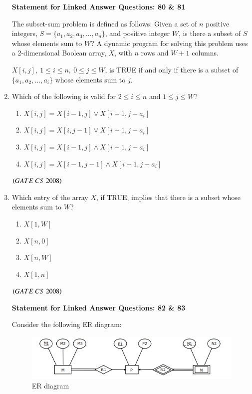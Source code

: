 \documentclass[journal, onecolumn]{IEEEtran}
\numberwithin{equation}{enumi}
\numberwithin{figure}{enumi}
\begin{document}
\begin{enumerate}
\begin{center}
\textbf{Statement for Linked Answer Questions: 80 \& 81}
\end{center}
\bigskip
The subset-sum problem is defined as follows: Given a set of $n$ positive integers, $S = \{a_1, a_2, a_3, \dots, a_n\}$, and positive integer $W$, is there a subset of $S$ whose elements sum to $W$? A dynamic program for solving this problem uses a 2-dimensional Boolean array, $X$, with $n$ rows and $W+1$ columns.

$X[i, j], \ 1 \leq i \leq n, \ 0 \leq j \leq W$, is TRUE if and only if there is a subset of $\{a_1, a_2, \dots, a_i\}$ whose elements sum to $j$.
\bigskip

\item Which of the following is valid for $2 \leq i \leq n$ and $1 \leq j \leq W$? 
\vspace{-1em}%
\begin{multicols}{2}
\begin{enumerate}
   \item $X[i, j] = X[i-1, j] \lor X[i-1, j-a_i]$  
   \item $X[i, j] = X[i, j-1] \lor X[i-1, j-a_i]$  
   \item $X[i, j] = X[i-1, j] \land X[i-1, j-a_i]$  
   \item $X[i, j]=X[i-1, j-1] \land X[i-1, j-a_i]$  
\end{enumerate}
\end{multicols}
\hfill $\left(GATE\ CS\  2008\right)$

\item Which entry of the array $X$, if TRUE, implies that there is a subset whose elements sum to $W$? 
\vspace{-1em}%
\begin{multicols}{4}
\begin{enumerate}
   \item $X[1, W]$  
   \item $X[n, 0]$  
   \item $X[n, W]$  
   \item $X[1, n]$  
\end{enumerate}
\end{multicols}
\hfill $\left(GATE\ CS\  2008\right)$

\begin{center}
\textbf{Statement for Linked Answer Questions: 82 \& 83}
\end{center}
Consider the following ER diagram:
\begin{figure}[H]
    \centering
    \includegraphics[width=0.5\columnwidth]{figs/fig8.png}
    \caption{ER diagram}
    \label{fig:8}
   \end{figure}


\end{enumerate}
\end{document}
